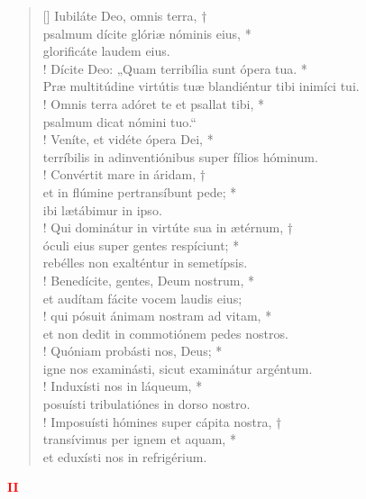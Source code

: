\begin{verse}[\versewidth]
Iubiláte Deo, omnis terra, †\\
psalmum dícite glóriæ nóminis eius, *\\
glorificáte laudem eius.\\!
\vin Dícite Deo: „Quam terribília sunt ópera tua. *\\
\vin Præ multitúdine virtútis tuæ blandiéntur tibi inimíci tui.\\!
Omnis terra adóret te et psallat tibi, *\\
psalmum dicat nómini tuo.“\\!
\vin Veníte, et vidéte ópera Dei, *\\
\vin terríbilis in adinventiónibus super fílios hóminum.\\!
Convértit mare in áridam, †\\
et in flúmine pertransíbunt pede; *\\
ibi lætábimur in ipso.\\!
\vin Qui dominátur in virtúte sua in ætérnum, †\\
\vin óculi eius super gentes respíciunt; *\\
\vin rebélles non exalténtur in semetípsis.\\!
Benedícite, gentes, Deum nostrum, *\\
et audítam fácite vocem laudis eius;\\!
\vin qui pósuit ánimam nostram ad vitam, *\\
\vin et non dedit in commotiónem pedes nostros.\\!
Quóniam probásti nos, Deus; *\\
igne nos examinásti, sicut examinátur argéntum.\\!
\vin Induxísti nos in láqueum, *\\
\vin posuísti tribulatiónes in dorso nostro.\\!
Imposuísti hómines super cápita nostra, †\\
transívimus per ignem et aquam, *\\
et eduxísti nos in refrigérium.\\
\end{verse}
\begin{center}
\textcolor{red}{\bf II}
\end{center}
